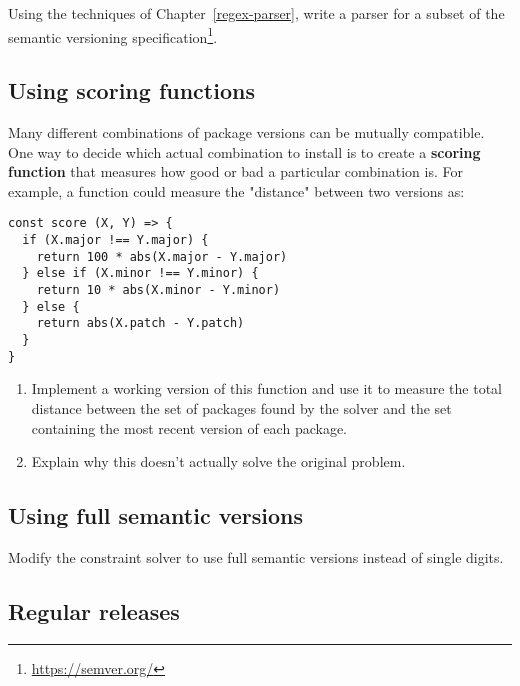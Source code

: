 \documentclass[krantzl]{krantz}
\newcommand{\chapref}[1]{Chapter~\ref{#1}}
\newcommand{\glossref}[1]{\textbf{#1}}
\newcommand{\hreffoot}[2]{{#1}\footnote{\href{#2}{#2}}}
\begin{document}
Using the techniques of \chapref{regex-parser},
write a parser for a subset of the \hreffoot{semantic versioning specification}{https://semver.org/}.

\subsection*{Using scoring functions}


Many different combinations of package versions can be mutually compatible.
One way to decide which actual combination to install
is to create a \glossref{scoring function}
that measures how good or bad a particular combination is.
For example,
a function could measure the "distance" between two versions as:

\begin{lstlisting}[frame=single,frameround=tttt]
const score (X, Y) => {
  if (X.major !== Y.major) {
    return 100 * abs(X.major - Y.major)
  } else if (X.minor !== Y.minor) {
    return 10 * abs(X.minor - Y.minor)
  } else {
    return abs(X.patch - Y.patch)
  }
}
\end{lstlisting}

\begin{enumerate}

\item 

Implement a working version of this function
    and use it to measure the total distance between
    the set of packages found by the solver
    and the set containing the most recent version of each package.



\item 

Explain why this doesn't actually solve the original problem.



\end{enumerate}

\subsection*{Using full semantic versions}


Modify the constraint solver to use full semantic versions instead of single digits.

\subsection*{Regular releases}
\end{document}
